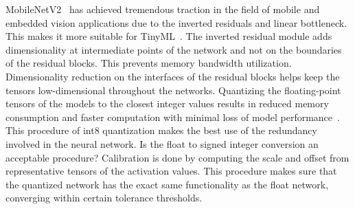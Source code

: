 \documentclass[a4paper,fleqn]{cas-sc}
\begin{document}
MobileNetV2~\cite{sandler2018mobilenetv2} has achieved tremendous traction in the field of mobile and embedded vision applications due to the inverted residuals and linear bottleneck. This makes it more suitable for TinyML~\cite{warden2019tinyml}. The inverted residual module adds dimensionality at intermediate points of the network and not on the boundaries of the residual blocks. This prevents memory bandwidth utilization. Dimensionality reduction on the interfaces of the residual blocks helps keep the tensors low-dimensional throughout the networks. Quantizing the floating-point tensors of the models to the closest integer values results in reduced memory consumption and faster computation with minimal loss of model performance~\cite{edgeimpulse2023}. This procedure of int8 quantization makes the best use of the redundancy involved in the neural network. Is the float to signed integer conversion an acceptable procedure? Calibration is done by computing the scale and offset from representative tensors of the activation values. This procedure makes sure that the quantized network has the exact same functionality as the float network, converging within certain tolerance thresholds.
\end{document}
